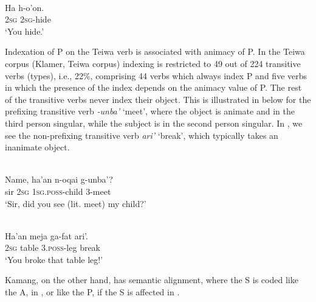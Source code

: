 \ea%
\label{bkm:Ref357868399}
 \\
\gll      Ha   h-o'on. \\  
   2\textsc{sg} 2\textsc{sg}{}-hide   \\
\glt  `You hide.'
\z







Indexation of P on the Teiwa verb is associated with animacy of P. In the Teiwa corpus (Klamer, Teiwa corpus) indexing is restricted to 49 out of 224 transitive verbs (types), i.e., {\Tilde}22\%, comprising 44 verbs which always index P and five verbs in which the presence of the index depends on the animacy value of P. The rest of the transitive verbs never index their object. This is illustrated in  below for the prefixing transitive verb \textit{{}-}\textit{unba'} `meet', where the object is animate and in the third person singular, while the subject is in the second person singular. In , we see the non-prefixing transitive verb \textit{ari'} `break', which typically takes an inanimate object.


\ea%
\label{bkm:Ref306280773}
 \\
\gll      Name,  ha'an  n-oqai  g-unba'?\\  
  sir  2\textsc{sg} 1\textsc{sg}.\textsc{poss}{}-child  3-meet   \\
\glt `Sir, did you see (lit. meet) my child?'
\z

 

 

 


\ea%
\label{bkm:Ref306280777}
 \\
\gll    Ha'an  meja  ga-fat  ari'.\\  
    2\textsc{sg}  table  3.\textsc{poss}{}-leg  break  \\
\glt  `You broke that table leg!' 
\z







Kamang, on the other hand, has semantic alignment, where the S is coded like the A,  in , or like the P, if the S is affected in . 


